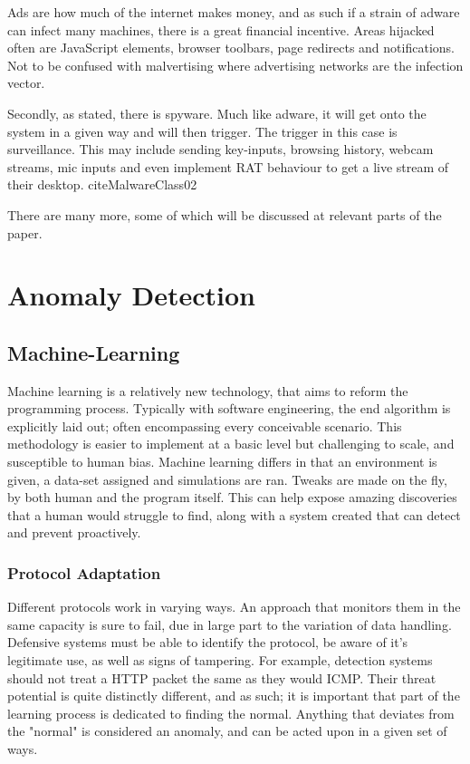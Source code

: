 Ads are how much of the internet makes money, and as such if a strain of adware can infect many machines, there is a great financial incentive.
Areas hijacked often are JavaScript elements, browser toolbars, page redirects and notifications. Not to be confused with malvertising where advertising networks are the infection vector. \citep{MalwareClass} 

Secondly, as stated, there is spyware. Much like adware, it will get onto the system in a given way and will then trigger. The trigger in this case is surveillance. This may include sending
key-inputs, browsing history, webcam streams, mic inputs and even implement RAT behaviour to get a live stream of their desktop. cite{MalwareClass02}  \citep{MalwareClass} 



There are many more, some of which will be discussed at relevant parts of the paper.


\section{Anomaly Detection}
\subsection{Machine-Learning}
Machine learning is a relatively new technology, that aims to reform the programming process. Typically with software engineering, the end algorithm is explicitly laid out; often encompassing every conceivable scenario.
This methodology is easier to implement at a basic level but challenging to scale, and susceptible to human bias. Machine learning differs in that an environment is given, a data-set assigned and simulations are ran. 
Tweaks are made on the fly, by both human and the program itself. This can help expose amazing discoveries that a human would struggle to find, along with a system created that can detect and prevent proactively.
\subsubsection{Protocol Adaptation}
Different protocols work in varying ways. An approach that monitors them in the same capacity is sure to fail, due in large part to the variation of data handling. Defensive systems must be able to identify the protocol,
be aware of it's legitimate use, as well as signs of tampering. For example, detection systems should not treat a HTTP packet the same as they would ICMP. Their threat potential is quite distinctly different, and as such;
it is important that part of the learning process is dedicated to finding the normal. Anything that deviates from the "normal" is considered an anomaly, and can be acted upon in a given set of ways.
